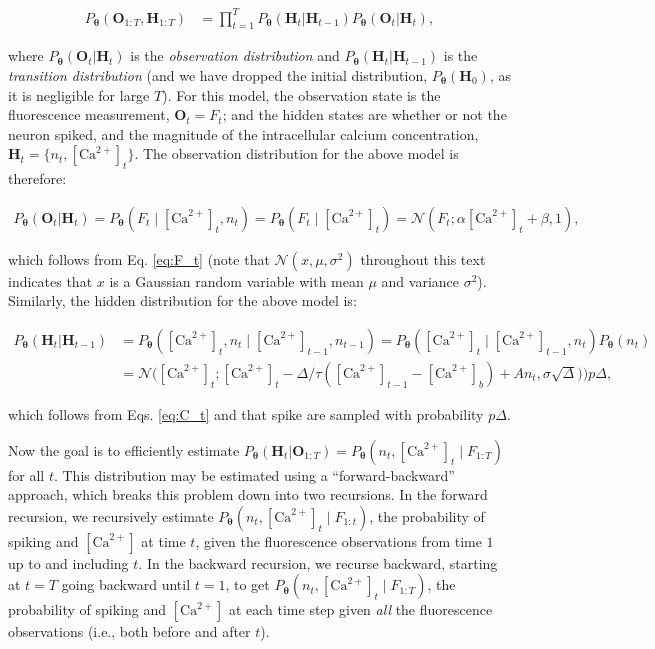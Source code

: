 \documentclass[12pt]{article}
\providecommand{\ve}[1]{\boldsymbol{#1}}
\providecommand{\ve}[1]{\boldsymbol{#1}}
\newcommand{\thetn}{\ve{\theta}}
\newcommand{\p}{P_{\thetn}}
\newcommand{\Ca}{[\text{Ca}^{2+}]}
\begin{document}
\begin{align} \label{eq:complete}
\p (\ve{O}_{1:T}, \ve{H}_{1:T}) &= \prod_{t=1}^T \p(\ve{H}_t | \ve{H}_{t-1}) \p(\ve{O}_t | \ve{H}_t),
\end{align}

\noindent where $\p(\ve{O}_t | \ve{H}_t)$ is the \emph{observation distribution} and $\p(\ve{H}_t | \ve{H}_{t-1})$ is the \emph{transition distribution} (and we have dropped the initial distribution, $\p(\ve{H}_0)$, as it is negligible for large $T$).  For this model, the observation state is the fluorescence measurement, $\ve{O}_t=F_t$; and the hidden states are whether or not the neuron spiked, and the magnitude of the intracellular calcium concentration, $\ve{H}_t=\{n_t,\Ca_t\}$. The observation distribution for the above model is therefore: %

\begin{align} \label{eq:obs_dist}
\p(\ve{O}_t | \ve{H}_t)  = \p(F_t \mid  \Ca_t,n_t) = \p(F_t \mid  \Ca_t) %
= \mathcal{N}(F_t; \alpha \Ca_t + \beta ,1),
\end{align} 

\noindent which follows from Eq. \ref{eq:F_t} (note that $\mathcal{N}(x,\mu,\sigma^2)$ throughout this text indicates that $x$ is a Gaussian random variable with mean $\mu$ and variance $\sigma^2$). Similarly, the hidden distribution for the above model is: %

\begin{align} \label{eq:trans_dist}
\p(\ve{H}_t | \ve{H}_{t-1}) &= \p(\Ca_t,n_t \mid \Ca_{t-1},n_{t-1}) = \p(\Ca_t \mid \Ca_{t-1}, n_t) \p(n_t) \nonumber \\
&= \mathcal{N}\big(\Ca_t; \Ca_t  -\Delta/\tau(\Ca_{t-1}-\Ca_b) + A n_t, \sigma \sqrt{\Delta})\big) p \Delta,
\end{align}

\noindent which follows from Eqs. \ref{eq:C_t} and that spike are sampled with probability $p \Delta$.

Now the goal is to efficiently estimate $\p(\ve{H}_t | \ve{O}_{1:T})=\p(n_t, \Ca_t \mid F_{1:T})$  for all $t$.  This distribution may be estimated using a ``forward-backward'' approach, which breaks this problem down into two recursions.  In the forward recursion, we recursively estimate $\p(n_t, \Ca_t \mid F_{1:t})$, the probability of spiking and $\Ca$ at time $t$, given the fluorescence observations from time $1$ up to and including $t$.  In the backward recursion, we recurse backward, starting at $t=T$ going backward until $t=1$,  to get $\p(n_t, \Ca_t \mid  F_{1:T})$, the probability of spiking and $\Ca$ at each time step given \emph{all} the fluorescence observations (i.e., both before and after $t$).
\end{document}
